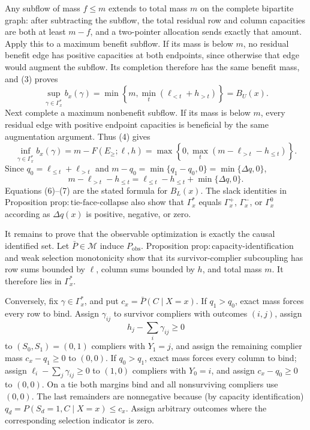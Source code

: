 Any subflow of mass \(f\le m\) extends to total mass \(m\) on the
complete bipartite graph: after subtracting the subflow, the total
residual row and column capacities are both at least \(m-f\), and a
two-pointer allocation sends exactly that amount.  Apply this to a
maximum benefit subflow.  If its mass is below \(m\), no residual benefit
edge has positive capacities at both endpoints, since otherwise that
edge would augment the subflow.  Its completion therefore has the same
benefit mass, and (3) proves
\[
\sup_{\gamma\in\Gamma_x^{\ast}}b_x(\gamma)
=\min\left\{m,\min_t(\ell_{<t}+h_{>t})\right\}=B_U(x).
\tag{5}
\]
Next complete a maximum nonbenefit subflow.  If its mass is below \(m\),
every residual edge with positive endpoint capacities is beneficial by
the same augmentation argument.  Thus (4) gives
\[
\inf_{\gamma\in\Gamma_x^{\ast}}b_x(\gamma)
=m-F(E_{\ge};\ell,h)
=\max\left\{0,\max_t(m-\ell_{>t}-h_{\le t})\right\}.
\tag{6}
\]
Since \(q_0=\ell_{\le t}+\ell_{>t}\) and
\(m-q_0=\min\{q_1-q_0,0\}=\min\{\Delta q,0\}\),
\[
m-\ell_{>t}-h_{\le t}
=\ell_{\le t}-h_{\le t}+\min\{\Delta q,0\}.
\tag{7}
\]
Equations (6)--(7) are the stated formula for \(B_L(x)\).  The slack
identities in Proposition \(\mathrm{prop{:}tie\text{-}face\text{-}collapse}\)
also show that \(\Gamma_x^{\ast}\) equals \(\Gamma_x^+\),
\(\Gamma_x^-\), or \(\Gamma_x^0\) according as \(\Delta q(x)\) is
positive, negative, or zero.

It remains to prove that the observable optimization is exactly the
causal identified set.  Let \(\bar P\in\mathcal M\) induce
\(P_{\mathrm{obs}}\).  Proposition
\(\mathrm{prop{:}capacity\text{-}identification}\) and weak selection
monotonicity show that its survivor-complier subcoupling has row sums
bounded by \(\ell\), column sums bounded by \(h\), and total mass \(m\).
It therefore lies in \(\Gamma_x^{\ast}\).

Conversely, fix \(\gamma\in\Gamma_x^{\ast}\), and put
\(c_x=\bar P(C\mid X=x)\).  If \(q_1>q_0\), exact mass forces every row
to bind.  Assign \(\gamma_{ij}\) to survivor compliers with outcomes
\((i,j)\), assign
\[
h_j-\sum_i\gamma_{ij}\ge0
\]
to \((S_0,S_1)=(0,1)\) compliers with \(Y_1=j\), and assign the remaining
complier mass \(c_x-q_1\ge0\) to \((0,0)\).  If \(q_0>q_1\), exact mass
forces every column to bind; assign
\(\ell_i-\sum_j\gamma_{ij}\ge0\) to \((1,0)\) compliers with \(Y_0=i\),
and assign \(c_x-q_0\ge0\) to \((0,0)\).  On a tie both margins bind and
all nonsurviving compliers use \((0,0)\).  The last remainders are
nonnegative because (by capacity identification)
\(q_d=P(S_d=1,C\mid X=x)\le c_x\).  Assign arbitrary outcomes where the
corresponding selection indicator is zero.

